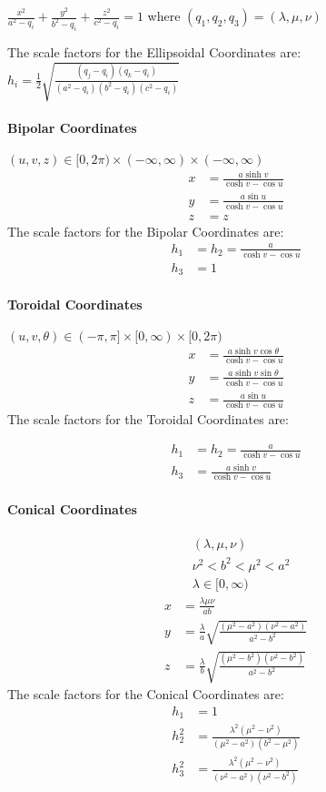\(\frac{x^2}{a^2 - q_i} + \frac{y^2}{b^2 - q_i} + \frac{z^2}{c^2 - q_i} = 1\)
where \((q_1,q_2,q_3)=(\lambda,\mu,\nu)\) 

The scale factors for the Ellipsoidal
Coordinates are:
\(h_i=\frac{1}{2} \sqrt{\frac{(q_j-q_i)(q_k-q_i)}{(a^2-q_i)(b^2-q_i)(c^2-q_i)}}\)

\paragraph{Bipolar Coordinates}
\((u,v,z)\in[0,2\pi)\times(-\infty,\infty)\times(-\infty,\infty)\)
\begin{align}
x&=\frac{a\sinh v}{\cosh v - \cos u}\\
y&=\frac{a\sin u}{\cosh v - \cos u}\\
z&=z
\end{align}
The scale factors for the Bipolar
Coordinates are:
\begin{align}
h_1&=h_2=\frac{a}{\cosh v - \cos u}\\
h_3&=1
\end{align}
\paragraph{Toroidal Coordinates} 
\((u,v,\theta)\in(-\pi,\pi]\times[0,\infty)\times[0,2\pi)\) 
\begin{align}
x &= \frac{a\sinh v \cos\theta}{\cosh v - \cos u}\\
y &= \frac{a\sinh v \sin\theta}{\cosh v - \cos u} \\
z &= \frac{a\sin u}{\cosh v - \cos u}
\end{align}
The scale factors for the Toroidal
Coordinates are:

\begin{align}
h_1&=h_2=\frac{a}{\cosh v - \cos u}\\
h_3&=\frac{a\sinh v}{\cosh v - \cos u}
\end{align}
\paragraph{Conical Coordinates} 

\begin{align}
& (\lambda,\mu,\nu)\\
& \nu^2 < b^2 < \mu^2 < a^2 \\
& \lambda \in [0,\infty)
\end{align}\begin{align}
x &= \frac{\lambda\mu\nu}{ab}\\
y &= \frac{\lambda}{a}\sqrt{\frac{(\mu^2-a^2)(\nu^2-a^2)}{a^2-b^2}} \\
z &= \frac{\lambda}{b}\sqrt{\frac{(\mu^2-b^2)(\nu^2-b^2)}{a^2-b^2}}
\end{align}
The scale factors for the Conical Coordinates are:
\begin{align}
h_1&=1\\
h_2^2&=\frac{\lambda^2(\mu^2-\nu^2)}{(\mu^2-a^2)(b^2-\mu^2)}\\
h_3^2&=\frac{\lambda^2(\mu^2-\nu^2)}{(\nu^2-a^2)(\nu^2-b^2)}
\end{align}



